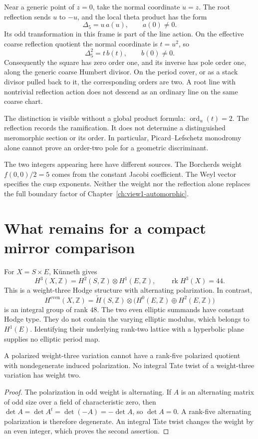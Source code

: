 Near a generic point of \(z=0\), take the normal coordinate
\(u=z\). The root reflection sends \(u\) to \(-u\), and the
local theta product has the form
\[
 \Delta_5=u\,a(u),\qquad a(0)\ne0.
\]
Its odd transformation in this frame is part of the line action.
On the effective coarse reflection quotient the normal coordinate is
\(t=u^2\), so
\[
 \Delta_5^2=t\,b(t),\qquad b(0)\ne0.
\]
Consequently the square has zero order one, and its inverse has pole
order one, along the generic coarse Humbert divisor. On the period
cover, or as a stack divisor pulled back to it, the corresponding
orders are two. A root line with nontrivial reflection action does
not descend as an ordinary line on the same coarse chart.

The distinction is visible without a global product formula:
\(\operatorname{ord}_{u}(t)=2\). The reflection records the
ramification. It does not determine a distinguished meromorphic
section or its order. In particular, Picard--Lefschetz monodromy
alone cannot prove an order-two pole for a geometric discriminant.

The two integers appearing here have different sources. The
Borcherds weight \(f(0,0)/2=5\) comes from the constant Jacobi
coefficient. The Weyl vector specifies the cusp exponents. Neither
the weight nor the reflection alone replaces the full boundary
factor of Chapter~\ref{ch:view1-automorphic}.

\section{What remains for a compact mirror comparison}
\label{subsec:k3xe-period-family}

For \(X=S\times E\), K\"unneth gives
\[
 H^3(X,\mathbb Z)=H^2(S,\mathbb Z)\otimes H^1(E,\mathbb Z),
 \qquad \operatorname{rk}H^3(X)=44.
\]
This is a weight-three Hodge structure with alternating
polarization. In contrast,
\[
 H^{\mathrm{even}}(X,\mathbb Z)
   =\widetilde H(S,\mathbb Z)\otimes
       \bigl(H^0(E,\mathbb Z)\oplus H^2(E,\mathbb Z)\bigr)
\]
is an integral group of rank \(48\).
The two even elliptic summands have constant Hodge type. They do not
contain the varying elliptic modulus, which belongs to \(H^1(E)\).
Identifying their underlying rank-two lattice with a hyperbolic
plane supplies no elliptic period map.

\begin{proposition}
\label{prop:view4-weight-three-obstruction}
A polarized weight-three variation cannot have a rank-five
polarized quotient with nondegenerate induced polarization.
No integral Tate twist of a weight-three variation has weight two.
\end{proposition}
\begin{proof}
The polarization in odd weight is alternating. If \(A\) is an
alternating matrix of odd size over a field of characteristic zero,
then
\(\det A=\det A^t=\det(-A)=-\det A\), so \(\det A=0\).
A rank-five alternating polarization is therefore degenerate.
An integral Tate twist changes the weight by an even integer,
which proves the second assertion.
\end{proof}

